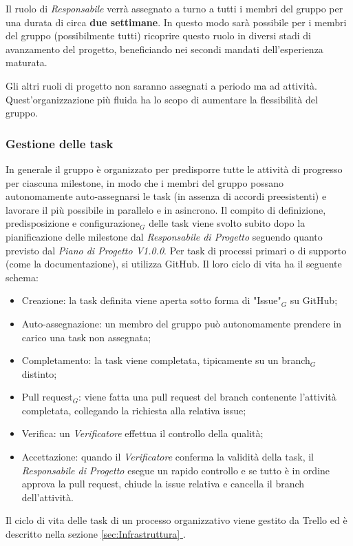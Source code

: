 Il ruolo di \textit{Responsabile} verrà assegnato a turno a tutti i membri del gruppo per una durata di circa \textbf{due settimane}. In questo modo sarà possibile per i membri del gruppo (possibilmente tutti) ricoprire questo ruolo in diversi stadi di avanzamento del progetto, beneficiando nei secondi mandati dell'esperienza maturata.

Gli altri ruoli di progetto non saranno assegnati a periodo ma ad attività. Quest'organizzazione più fluida ha lo scopo di aumentare la flessibilità del gruppo.

\subsubsection{Gestione delle task}
In generale il gruppo è organizzato per predisporre tutte le attività di progresso per ciascuna milestone, in modo che i membri del gruppo possano autonomamente auto-assegnarsi le task (in assenza di accordi preesistenti) e lavorare il più possibile in parallelo e in asincrono. Il compito di definizione, predisposizione e configurazione$_G$ delle task viene svolto subito dopo la pianificazione delle milestone dal \textit{Responsabile di Progetto} seguendo quanto previsto dal \textit{Piano di Progetto V1.0.0}.
Per task di processi primari o di supporto (come la documentazione), si utilizza GitHub. Il loro ciclo di vita ha il seguente schema:
\begin{itemize}
  \item Creazione: la task definita viene aperta sotto forma di "Issue"$_G$ su GitHub;
  \item Auto-assegnazione: un membro del gruppo può autonomamente prendere in carico una task non assegnata;
  \item Completamento: la task viene completata, tipicamente su un branch$_G$ distinto;
  \item Pull request$_G$: viene fatta una pull request del branch contenente l'attività completata, collegando la richiesta alla relativa issue;
  \item Verifica: un \textit{Verificatore} effettua il controllo della qualità;
  \item Accettazione: quando il \textit{Verificatore} conferma la validità della task, il \textit{Responsabile di Progetto} esegue un rapido controllo e se tutto è in ordine approva la pull request, chiude la issue relativa e cancella il branch dell'attività.
\end{itemize}

Il ciclo di vita delle task di un processo organizzativo viene gestito da Trello ed è descritto nella sezione \underline{\ref{sec:Infrastruttura} }.

